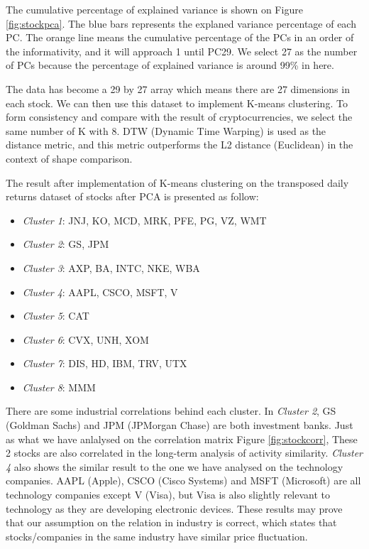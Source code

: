 \documentclass[11pt]{article} %
\theoremstyle{plain}
\theoremstyle{definition}
\begin{document}
The cumulative percentage of explained variance is shown on Figure \ref{fig:stockpca}. The blue bars represents the explaned variance percentage of each PC. The orange line means the cumulative percentage of the PCs in an order of the informativity, and it will approach 1 until PC29. We select 27 as the number of PCs because the percentage of explained variance is around 99\% in here.

The data has become a 29 by 27 array which means there are 27 dimensions in each stock. We can then use this dataset to implement K-means clustering. To form consistency and compare with the result of cryptocurrencies, we select the same number of K with 8. DTW (Dynamic Time Warping) is used as the distance metric, and this metric outperforms the L2 distance (Euclidean) in the context of shape comparison.

The result after implementation of K-means clustering on the transposed daily returns dataset of stocks after PCA is presented as follow:
\begin{itemize}
    \item \textsl{Cluster 1}: JNJ, KO, MCD, MRK, PFE, PG, VZ, WMT
    \item \textsl{Cluster 2}: GS, JPM
    \item \textsl{Cluster 3}: AXP, BA, INTC, NKE, WBA
    \item \textsl{Cluster 4}: AAPL, CSCO, MSFT, V
    \item \textsl{Cluster 5}: CAT
    \item \textsl{Cluster 6}: CVX, UNH, XOM
    \item \textsl{Cluster 7}: DIS, HD, IBM, TRV, UTX
    \item \textsl{Cluster 8}: MMM
\end{itemize}

There are some industrial correlations behind each cluster. In \textsl{Cluster 2}, GS (Goldman Sachs) and JPM (JPMorgan Chase) are both investment banks. Just as what we have anlalysed on the correlation matrix Figure \ref{fig:stockcorr}, These 2 stocks are also correlated in the long-term analysis of activity similarity. \textsl{Cluster 4} also shows the similar result to the one we have analysed on the technology companies. AAPL (Apple), CSCO (Cisco Systems) and MSFT (Microsoft) are all technology companies except V (Visa), but Visa is also slightly relevant to technology as they are developing electronic devices. These results may prove that our assumption on the relation in industry is correct, which states that stocks/companies in the same industry have similar price fluctuation.
\end{document}

